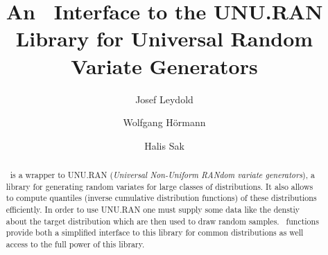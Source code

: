 
\subject{{\Huge\Runuran}}

\title{%
  An \R\ Interface to the UNU.RAN Library
  for Universal Random Variate Generators}

\author{Josef Leydold \and Wolfgang H\"ormann \and Halis Sak}

\publishers{%
  Department of Statistics and Mathematics, WU Wien, Austria\\
  Department for Industrial Engineering,
  Bo\u{g}azi\c{c}i University, Istanbul, Turkey
}


\maketitle


\begin{abstract}
  \noindent
  \Runuran\ is a wrapper to UNU.RAN (\emph{Universal
    Non-Uniform RANdom variate generators}), a library for generating
  random variates for large classes of distributions. It also allows
  to compute quantiles (inverse cumulative distribution 
  functions) of these distributions efficiently. 
  In order to use UNU.RAN one must supply some data like the denstiy 
  about the target distribution which are then used to draw random samples.
  \Runuran\ functions provide both a simplified interface to this
  library for common distributions as well access to the full power of
  this library.
\end{abstract}

